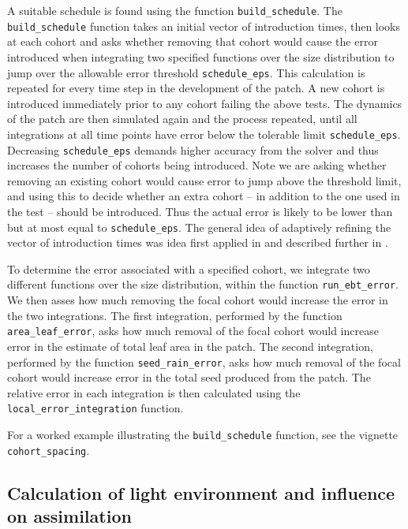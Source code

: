 \documentclass[10pt,twoside]{article}
\begin{document}
A suitable schedule is found using the function \texttt{build\_schedule}.
The \texttt{build\_schedule} function takes an
initial vector of introduction times, then looks at each cohort and asks
whether removing that cohort would cause the error introduced when
integrating two specified functions over the size distribution to jump
over the allowable error threshold \texttt{schedule\_eps}. This
calculation is repeated for every time step in the development of the
patch. A new cohort is introduced immediately prior to any cohort
failing the above tests. The dynamics of the patch are
then simulated again and the process repeated, until all integrations at
all time points have error below the tolerable limit
\texttt{schedule\_eps}. Decreasing \texttt{schedule\_eps} demands higher
accuracy from the solver and thus increases the number of cohorts being
introduced. Note we are asking whether removing an existing cohort would
cause error to jump above the threshold limit, and using this to decide
whether an extra cohort -- in addition to the one used in the test --
should be introduced. Thus the actual error is likely to
be lower than but at most equal to \texttt{schedule\_eps}. The general idea
of adaptively refining the vector of introduction times was idea first applied
in \citet{Falster-2011} and described further in \citet{Falster-2015}.

To determine the error associated with a specified cohort, we integrate
two different functions over the size distribution, within the function
\texttt{run\_ebt\_error}. We then asses how much removing the focal
cohort would increase the error in the two integrations. The first
integration, performed by the function \texttt{area\_leaf\_error}, asks
how much removal of the focal cohort would increase error in the
estimate of total leaf area in the patch. The second integration,
performed by the function \texttt{seed\_rain\_error}, asks how much
removal of the focal cohort would increase error in the total seed
produced from the patch. The relative error in each integration is then
calculated using the \texttt{local\_error\_integration} function.

For a worked example illustrating the \texttt{build\_schedule} function,
see the vignette \texttt{cohort\_spacing}.

\subsection{Calculation of light environment and influence on
assimilation}\label{calculation-of-light-environment-and-influence-on-assimilation}
\end{document}

